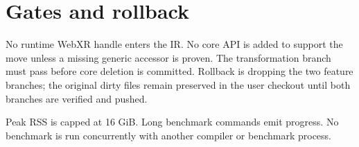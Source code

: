 \documentclass[11pt]{article}
\begin{document}
\section{Gates and rollback}
No runtime WebXR handle enters the IR.  No core API is added to support the
move unless a missing generic accessor is proven.  The transformation branch
must pass before core deletion is committed.  Rollback is dropping the two
feature branches; the original dirty files remain preserved in the user
checkout until both branches are verified and pushed.

Peak RSS is capped at 16 GiB.  Long benchmark commands emit progress.  No
benchmark is run concurrently with another compiler or benchmark process.
\end{document}
